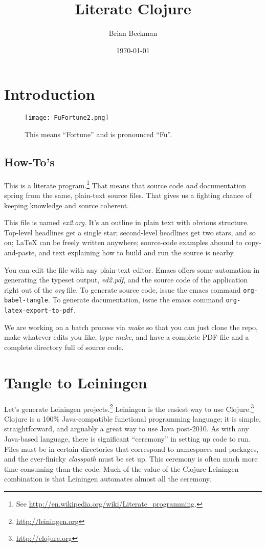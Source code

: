 \documentclass[11pt]{article}
\author{Brian Beckman}
\date{\today}
\title{Literate Clojure}
\begin{document}
\maketitle
\tableofcontents


\section{Introduction}
\label{sec-1}
\begin{figure}
  \centering
  \texttt{[image: FuFortune2.png]}
  \caption{\label{fig:fufortune}This means ``Fortune'' and is pronounced ``Fu''.}
\end{figure}

\subsection{How-To's}
\label{sec-1-1}
This is a literate program.\footnote{See
  \url{http://en.wikipedia.org/wiki/Literate_programming}.} That means that
source code \emph{and} documentation spring from the same, plain-text
source files. That gives us a fighting chance of keeping knowledge
and source coherent.

This file is named \emph{ex2.org}. It's an outline in plain text with
obvious structure. Top-level headlines get a single star;
second-level headlines get two stars, and so on; \LaTeX{} can be
freely written anywhere; source-code examples abound to
copy-and-paste, and text explaining how to build and run the source
is nearby.

You can edit the file with any plain-text editor. Emacs offers some
automation in generating the typeset output, \emph{ed2.pdf}, and the
source code of the application right out of the \emph{org} file. To
generate source code, issue the emacs command
\verb|org-babel-tangle|. To generate documentation, issue the emacs
command \verb|org-latex-export-to-pdf|.

We are working on a batch process via \emph{make} so that you can just
clone the repo, make whatever edits you like, type \emph{make}, and have
a complete PDF file and a complete directory full of source code.
\section{Tangle to Leiningen}
\label{sec-2}
Let's generate Leiningen projects.\footnote{\url{http://leiningen.org}}
Leiningen is the easiest way to use Clojure.\footnote{\url{http://clojure.org}}
Clojure is a 100\% Java-compatible functional programming language;
it is simple, straightforward, and arguably a great way to use Java
post-2010. As with any Java-based language, there is significant
``ceremony'' in setting up code to run. Files must be in certain
directories that correspond to namespaces and packages, and the
ever-finicky \emph{classpath} must be set up. This ceremony is often much
more time-consuming than the code. Much of the value of the
Clojure-Leiningen combination is that Leiningen automates almost all
the ceremony.
\end{document}
